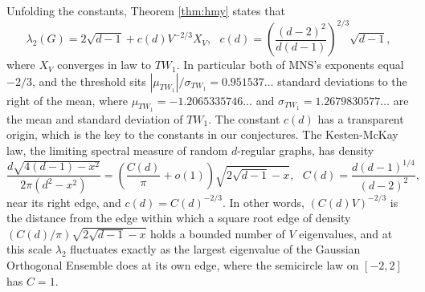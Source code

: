 \documentclass[12pt,oneside,english]{amsart}
\numberwithin{equation}{section}
\numberwithin{figure}{section}
\numberwithin{table}{section}
\theoremstyle{plain}
\numberwithin{thm}{section}
\theoremstyle{plain}
\theoremstyle{plain}
\theoremstyle{plain}
\theoremstyle{definition}
\theoremstyle{definition}
\theoremstyle{definition}
\theoremstyle{remark}
\begin{document}
Unfolding the constants, Theorem \ref{thm:hmy} states that
\begin{equation}
\lambda_{2}(G)=2\sqrt{d-1}+c(d)V^{-2/3}X_{V},\ \ \ c(d)=\left(\frac{(d-2)^{2}}{d(d-1)}\right)^{2/3}\sqrt{d-1},\label{eq:hmy_constants}
\end{equation}
where $X_{V}$ converges in law to $TW_{1}$. In particular both of
MNS's exponents equal $-2/3$, and the threshold sits $\left|\mu_{TW_{1}}\right|/\sigma_{TW_{1}}=0.951537\dots$
standard deviations to the right of the mean, where $\mu_{TW_{1}}=-1.2065335746\dots$
and $\sigma_{TW_{1}}=1.2679830577\dots$ are the mean and standard
deviation of $TW_{1}$. The constant $c(d)$ has a transparent origin,
which is the key to the constants in our conjectures. The Kesten-McKay
law, the limiting spectral measure of random $d$-regular graphs, has
density
\begin{equation}
\frac{d\sqrt{4(d-1)-x^{2}}}{2\pi(d^{2}-x^{2})}=\left(\frac{C(d)}{\pi}+o(1)\right)\sqrt{2\sqrt{d-1}-x},\ \ \ C(d)=\frac{d(d-1)^{1/4}}{(d-2)^{2}},\label{eq:kesten_mckay_edge}
\end{equation}
near its right edge, and $c(d)=C(d)^{-2/3}$. In other words, $(C(d)V)^{-2/3}$
is the distance from the edge within which a square root edge of density
$(C(d)/\pi)\sqrt{2\sqrt{d-1}-x}$ holds a bounded number of $V$ eigenvalues,
and at this scale $\lambda_{2}$ fluctuates exactly as the largest
eigenvalue of the Gaussian Orthogonal Ensemble does at its own edge,
where the semicircle law on $[-2,2]$ has $C=1$.
\end{document}
